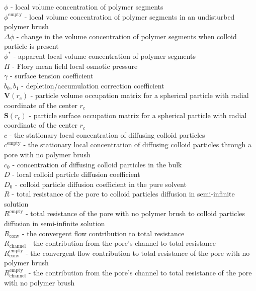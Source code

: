 \documentclass[12pt, a4paper]{article}
\begin{document}
$\phi$ - local volume concentration of polymer segments \\
$\phi^{\textrm{empty}}$ - local volume concentration of polymer segments in an undisturbed polymer brush \\
$\Delta \phi$ - change in the volume concentration of polymer segments when colloid particle is present \\
$\phi^{\ast}$ - apparent local volume concentration of polymer segments \\
$\Pi$ - Flory mean field local osmotic pressure \\
$\gamma$ - surface tension coefficient \\
$b_0, b_1$ - depletion/accumulation correction coefficient \\
$\textbf{V}(r_{c})$ - particle volume occupation matrix for a spherical particle with radial coordinate of the center $r_{c}$ \\
$\textbf{S}(r_{c})$ - particle surface occupation matrix for a spherical particle with radial coordinate of the center $r_{c}$ \\
$c$ - the stationary local concentration of diffusing colloid particles \\
$c^{\textrm{empty}}$ - the stationary local concentration of diffusing colloid particles through a pore with no polymer brush \\
$c_0$ - concentration of diffusing colloid particles in the bulk \\
$D$ - local colloid particle diffusion coefficient \\
$D_0$ - colloid particle diffusion coefficient in the pure solvent \\
$R$ - total resistance of the pore to colloid particles diffusion in semi-infinite solution \\
$R^{\textrm{empty}}$ - total resistance of the pore with no polymer brush to colloid particles diffusion in semi-infinite solution \\
$R_{\textrm{conv}}$ - the convergent flow contribution to total resistance \\
$R_{\textrm{channel}}$ - the contribution from the pore's channel to total resistance \\
$R^{\textrm{empty}}_{\textrm{conv}}$ - the convergent flow contribution to total resistance of the pore with no polymer brush \\
$R^{\textrm{empty}}_{\textrm{channel}}$ - the contribution from the pore's channel to total resistance of the pore with no polymer brush \\
\end{document}
